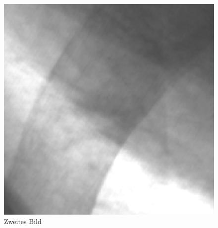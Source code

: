 \documentclass[a4paper,12pt]{article}
\theoremstyle{definition}
\theoremstyle{remark}
\begin{document}
\begin{figure}[H]
\begin{minipage}{0.49\textwidth}
    \includegraphics[width=\linewidth]{Bilder/original_zoomed.png}
    \caption{Zweites Bild}
    \label{fig:bild2}
  \end{minipage}
\end{figure}
\end{document}

